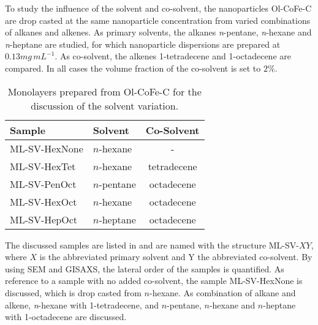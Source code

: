 \documentclass[\main/dresen_thesis.tex]{subfiles}
\begin{document}
      To study the influence of the solvent and co-solvent, the nanoparticles Ol-CoFe-C are drop casted at the same nanoparticle concentration from varied combinations of alkanes and alkenes.
      As primary solvents, the alkanes \textit{n}-pentane, \textit{n}-hexane and \textit{n}-heptane are studied, for which nanoparticle dispersions are prepared at $0.13 \unit{mg \, mL^{-1}}$.
      As co-solvent, the alkenes 1-tetradecene and 1-octadecene are compared.
      In all cases the volume fraction of the co-solvent is set to $2 \%$.
      \begin{table}[!htbp]
        \centering
        \caption{\label{tab:monolayers:charMethod:varyAlkaneAlkene}Monolayers prepared from Ol-CoFe-C for the discussion of the solvent variation.}
        \begin{tabular}{ l | l | c }
          \textbf{Sample} & Solvent              & Co-Solvent \\
          \hline
          ML-SV-HexNone   & $\mathit{n}$-hexane  & -          \\
          ML-SV-HexTet    & $\mathit{n}$-hexane  & tetradecene\\
          ML-SV-PenOct    & $\mathit{n}$-pentane & octadecene \\
          ML-SV-HexOct    & $\mathit{n}$-hexane  & octadecene \\
          ML-SV-HepOct    & $\mathit{n}$-heptane & octadecene \\
          \hline
        \end{tabular}
      \end{table}

      The discussed samples are listed in  and are named with the structure ML-SV-$XY$, where $X$ is the abbreviated primary solvent and Y the abbreviated co-solvent.
      By using SEM and GISAXS, the lateral order of the samples is quantified.
      As reference to a sample with no added co-solvent, the sample ML-SV-HexNone is discussed, which is drop casted from $\mathit{n}$-hexane.
      As combination of alkane and alkene, \textit{n}-hexane with 1-tetradecene, and $\mathit{n}$-pentane, $\mathit{n}$-hexane and $\mathit{n}$-heptane with 1-octadecene are discussed.
\end{document}
